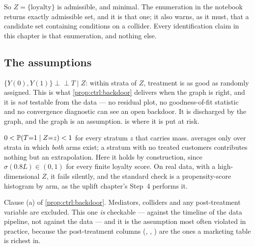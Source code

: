 So $Z = \{\text{loyalty}\}$ is admissible, and minimal. The  enumeration in the
notebook returns exactly \nbFiveNAdjSets{} admissible set, and it is that one; it also warns, as
it must, that a candidate set containing  conditions on a collider. Every
identification claim in this chapter is that enumeration, and nothing else.

\subsection*{The assumptions}

\begin{assumption}\label{as:ctrl:backdoor}
$\{Y(0), Y(1)\} \perp\!\!\!\perp T \mid Z$: within strata of $Z$, treatment is as good as
randomly assigned. This is what \cref{prop:ctrl:backdoor} delivers when the graph is right, and
it is \emph{not} testable from the data --- no residual plot, no goodness-of-fit statistic and no
convergence diagnostic can see an open backdoor. It is discharged by the graph, and the graph is
an assumption.  is where it is put at risk.
\end{assumption}

\begin{assumption}\label{as:ctrl:positivity}
$0 < \operatorname{\mathbb{P}}(T{=}1 \mid Z{=}z) < 1$ for every stratum $z$ that carries mass. 
averages only over strata in which \emph{both} arms exist; a stratum with no treated customers
contributes nothing but an extrapolation. Here it holds by construction, since
$\sigma(0.8L) \in (0,1)$ for every finite loyalty score. On real data, with a high-dimensional
$Z$, it fails silently, and the standard check is a propensity-score histogram by arm, as the
uplift chapter's Step~4 performs it.
\end{assumption}

\begin{assumption}\label{as:ctrl:descendants}
Clause (a) of \cref{prop:ctrl:backdoor}. Mediators, colliders and any post-treatment variable
are excluded. This one \emph{is} checkable --- against the timeline of the data pipeline, not
against the data --- and it is the assumption most often violated in practice, because the
post-treatment columns (, , ) are the ones a
marketing table is richest in.
\end{assumption}

